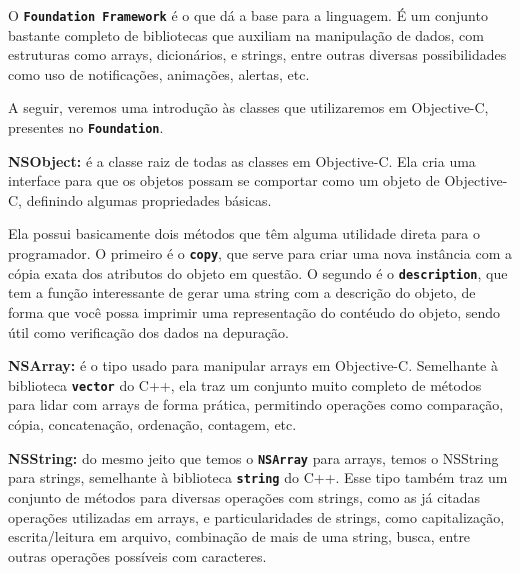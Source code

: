 \documentclass[a4paper,12pt,brazil,doubleside]{book}
\begin{document}
\begin{singlespace}
O \texttt{\textbf{Foundation Framework}} é o que dá a base para a linguagem. É um conjunto bastante completo de bibliotecas que auxiliam na manipulação de dados, com estruturas como arrays, dicionários, e strings, entre outras diversas possibilidades como uso de notificações, animações, alertas, etc.

A seguir, veremos uma introdução às classes que utilizaremos em Objective-C, presentes no \texttt{\textbf{Foundation}}.

\begin{description}
\item{\textbf{NSObject:} é a classe raiz de todas as classes em Objective-C. Ela cria uma interface para que os objetos possam se comportar como um objeto de Objective-C, definindo algumas propriedades básicas.

Ela possui basicamente dois métodos que têm alguma utilidade direta para o programador. O primeiro é o \texttt{\textbf{copy}}, que serve para criar uma nova instância com a cópia exata dos atributos do objeto em questão. O segundo é o \texttt{\textbf{description}}, que tem a função interessante de gerar uma string com a descrição do objeto, de forma que você possa imprimir uma representação do contéudo do objeto, sendo útil como verificação dos dados na depuração.}

\item{\textbf{NSArray:} é o tipo usado para manipular arrays em Objective-C. Semelhante à biblioteca \texttt{\textbf{vector}} do C++, ela traz um conjunto muito completo de métodos para lidar com arrays de forma prática, permitindo operações como comparação, cópia, concatenação, ordenação, contagem, etc.}

\item{\textbf{NSString:} do mesmo jeito que temos o \texttt{\textbf{NSArray}} para arrays, temos o NSString para strings, semelhante à biblioteca \texttt{\textbf{string}} do C++. Esse tipo também traz um conjunto de métodos para diversas operações com strings, como as já citadas operações utilizadas em arrays, e particularidades de strings, como capitalização, escrita/leitura em arquivo, combinação de mais de uma string, busca, entre outras operações possíveis com caracteres.}


\end{description}
\end{singlespace}
\end{document}
